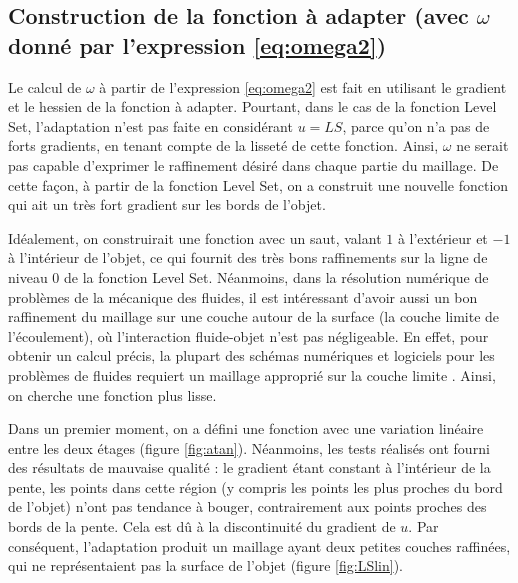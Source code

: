 \subsection{Construction de la fonction à adapter (avec \(\omega\) donné par l'expression \eqref{eq:omega2})}

\indent Le calcul de \(\omega\) à partir de l'expression \eqref{eq:omega2} est fait en utilisant le gradient et le hessien de la fonction à adapter. Pourtant, dans le cas de la fonction Level Set, l'adaptation n'est pas faite en considérant \(u=LS\), parce qu'on n'a pas de forts gradients, en tenant compte de la lisseté de cette fonction. Ainsi, \(\omega\) ne serait pas capable d'exprimer le raffinement désiré dans chaque partie du maillage. De cette façon, à partir de la fonction Level Set, on a construit une nouvelle fonction qui ait un très fort gradient sur les bords de l'objet.

\indent Idéalement, on construirait une fonction avec un saut, valant \(1\) à l'extérieur et \(-1\) à l'intérieur de l'objet, ce qui fournit des très bons raffinements sur la ligne de niveau 0 de la fonction Level Set. Néanmoins, dans la résolution numérique de problèmes de la mécanique des fluides, il est intéressant d'avoir aussi un bon raffinement du maillage sur une couche autour de la surface (la couche limite de l'écoulement), où l'interaction fluide-objet n'est pas négligeable. En effet, pour obtenir un calcul précis,  la plupart des schémas numériques et logiciels pour les problèmes de fluides requiert un maillage approprié sur la couche limite \cite{loseille}. Ainsi, on cherche une fonction plus lisse.

\indent Dans un premier moment, on a défini une fonction avec une variation linéaire entre les deux étages (figure \ref{fig:atan}). Néanmoins, les tests réalisés ont fourni des résultats de mauvaise qualité : le gradient étant constant à l'intérieur de la pente, les points dans cette région (y compris les points les plus proches du bord de l'objet) n'ont pas tendance à bouger, contrairement aux points proches des bords de la pente. Cela est dû à la discontinuité du gradient de \(u\). Par conséquent, l'adaptation produit un maillage ayant deux petites couches raffinées, qui ne représentaient pas la surface de l'objet (figure \ref{fig:LSlin}).

\indent

